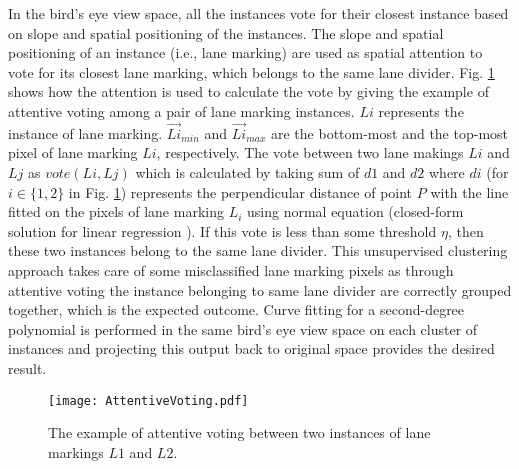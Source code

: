 \documentclass[fleqn,10pt,twocolumn]{ICCAS2019}
\begin{document}
In the bird's eye view space, all the instances vote for their closest instance based on slope and spatial positioning of the instances. The slope and spatial positioning of an instance (i.e., lane marking) are used as spatial attention to vote for its closest lane marking, which belongs to the same lane divider. Fig. \ref{voting} shows how the attention is used to calculate the vote by giving the example of attentive voting among a pair of lane marking instances. $Li$ represents the instance of lane marking. $\overrightarrow{Li}_{min}$ and $\overrightarrow{Li}_{max}$ are the bottom-most and the top-most pixel of lane marking $Li$, respectively. The vote between two lane makings $Li$ and $Lj$ as $vote(Li,Lj)$ which is calculated by taking sum of $d1$ and $d2$ where $di$ (for $i \in \{1,2\}$ in Fig. \ref{voting}) represents the perpendicular distance of point $P$ with the line fitted on the pixels of lane marking $L_i$ using normal equation (closed-form solution for linear regression \cite{bishop}). If this vote is less than some threshold $\eta$, then these two instances belong to the same lane divider. This unsupervised clustering approach takes care of some misclassified lane marking pixels as through attentive voting the instance belonging to same lane divider are correctly grouped together, which is the expected outcome. Curve fitting for a second-degree polynomial is performed in the same bird's eye view space on each cluster of instances and projecting this output back to original space provides the desired result.

\begin{figure}[t]
\begin{center}
\texttt{[image: AttentiveVoting.pdf]}
\caption{The example of attentive voting between two instances of lane markings $L1$ and $L2$.}
\label{voting}
\end{center}
\end{figure}
\end{document}
